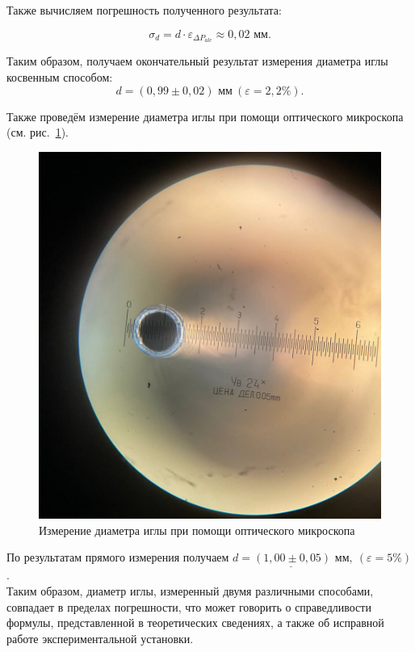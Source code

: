 \documentclass[a4paper, 12pt]{article}
\begin{document}
    \noindent Также вычисляем погрешность полученного результата:

    \begin{equation}
        \label{igla_pogr}
        \sigma_d=d\cdot\varepsilon_{\Delta P_{alc}} \approx 0,02 \text{ мм}.
    \end{equation}

    \noindent Таким образом, получаем окончательный результат измерения диаметра иглы косвенным способом:
    $$\boxed{ d = (0,99 \pm 0,02) \text{ мм}} \: (\varepsilon = 2,2\%).$$

    \noindent Также проведём измерение диаметра иглы при помощи оптического микроскопа (см. рис.~\ref{img:igla}).

    \begin{figure}[H]
        \centering
        \includegraphics[width=16cm]{images/spine.jpeg}
        \caption{Измерение диаметра иглы при помощи оптического микроскопа}
        \label{img:igla}
    \end{figure}

    \noindent По результатам прямого измерения получаем $ \underline{d = (1,00 \pm 0,05) \text{ мм}}, \: (\varepsilon = 5\%) $.\\

    \noindent Таким образом, диаметр иглы, измеренный двумя различными способами, совпадает в пределах погрешности, что может говорить о справедливости формулы, представленной в теоретических сведениях, а также об исправной работе экспериментальной установки.
\end{document}
